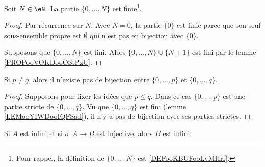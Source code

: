 \begin{lemma}       \label{LEMooYIWDooIQFSad}
	Soit \( N\in \eN\). La partie \( \{ 0,\ldots, N \}\) est finie\footnote{Pour rappel, la définition de \( \{ 0,\ldots, N \}\) est \ref{DEFooKBUFooLvMHrf}.}.
\end{lemma}

\begin{proof}
	Par récurrence sur \( N\). Avec \( N=0\), la partie \( \{ 0 \}\) est finie parce que son seul sous-ensemble propre est \( \emptyset\) qui n'est pas en bijection avec \( \{ 0 \}\).

	Supposons que \( \{ 0,\ldots, N \}\) est fini. Alors \( \{ 0,\ldots, N \}\cup \{ N+1 \}\) est fini par le lemme \ref{PROPooVOKDooOStPzU}.
\end{proof}

\begin{lemma}       \label{LEMooJDGOooHdyJnu}
	Si \( p\neq q\), alors il n'existe pas de bijection entre \( \{ 0,\ldots, p \}\) et \( \{ 0,\ldots, q \}\).
\end{lemma}

\begin{proof}
	Supposons pour fixer les idées que \( p\leq q\). Dans ce cas \( \{ 0,\ldots, p \}\) est une partie stricte de \( \{ 0,\ldots, q \}\). Vu que \( \{ 0,\ldots, q \}\) est fini (lemme \ref{LEMooYIWDooIQFSad}), il n'y a pas de bijection avec ses parties strictes.
\end{proof}

\begin{proposition}    \label{PROPooWKSIooHcfYPN}
	Si \( A\) est infini et si \( \sigma\colon A\to B\) est injective, alors \( B\) est infini.
\end{proposition}

